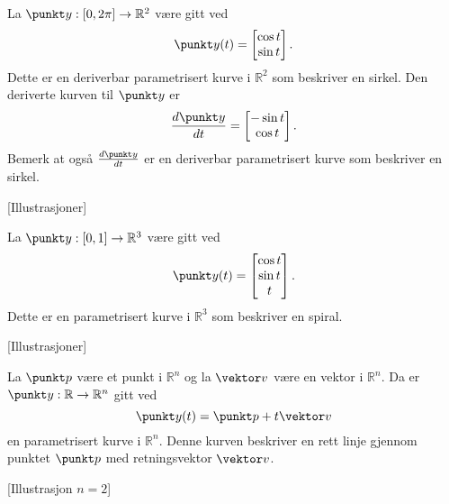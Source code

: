 \begin{eksempel}
  La $\punkt y: [0, 2\pi] \to \mathbb{R}^2$ være gitt ved
  $$\punkt y(t) = \begin{bmatrix} \cos t \\ \sin t \end{bmatrix}.$$
  Dette er en deriverbar parametrisert kurve i $\mathbb{R}^2$ som beskriver en sirkel.
  Den deriverte kurven til $\punkt y$ er
  $$\frac{d \punkt y}{dt} = \begin{bmatrix} -\sin t \\ \cos t \end{bmatrix}.$$
  Bemerk at også $\frac{d \punkt y}{dt}$ er en deriverbar parametrisert kurve som beskriver en sirkel.
\end{eksempel}
[Illustrasjoner]

\begin{eksempel}
  La $\punkt y: [0, 1] \to \mathbb{R}^3$ være gitt ved
  $$\punkt y(t) = \begin{bmatrix} \cos t \\ \sin t \\ t \end{bmatrix}.$$
  Dette er en parametrisert kurve i $\mathbb{R}^3$ som beskriver en spiral.
\end{eksempel}
[Illustrasjoner]

\begin{eksempel}
  La $\punkt p$ være et punkt i $\mathbb{R}^n$ og la $\vektor v$ være en vektor i $\mathbb{R}^n$.
  Da er $\punkt y: \mathbb{R} \to \mathbb{R}^n$ gitt ved
  $$\punkt y(t) = \punkt p + t \vektor v$$
  en parametrisert kurve i $\mathbb{R}^n$.
  Denne kurven beskriver en rett linje gjennom punktet $\punkt p$ med retningsvektor $\vektor v$.
\end{eksempel}
[Illustrasjon $n=2$]



